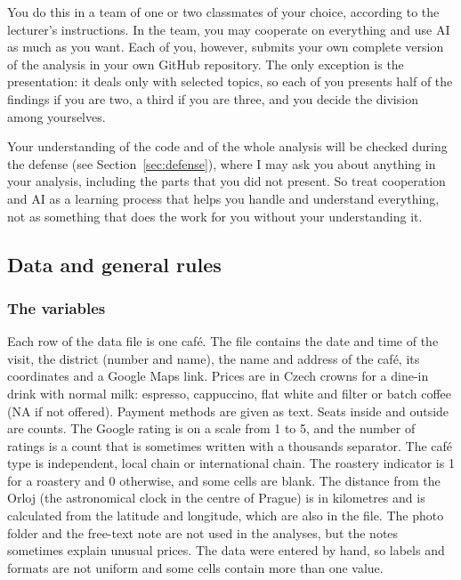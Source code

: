 \documentclass[11pt,a4paper]{article}
\begin{document}
You do this in a team of one or two classmates of your choice, according to the lecturer's instructions. In the team, you may cooperate on everything and use AI as much as you want. Each of you, however, submits your own complete version of the analysis in your own GitHub repository. The only exception is the presentation: it deals only with selected topics, so each of you presents half of the findings if you are two, a third if you are three, and you decide the division among yourselves.

Your understanding of the code and of the whole analysis will be checked during the defense (see Section~\ref{sec:defense}), where I may ask you about anything in your analysis, including the parts that you did not present. So treat cooperation and AI as a learning process that helps you handle and understand everything, not as something that does the work for you without your understanding it.

\subsection{Data and general rules}\label{sec:rules}

\subsubsection*{The variables}

Each row of the data file is one caf\'e. The file contains the date and time of the visit, the district (number and name), the name and address of the caf\'e, its coordinates and a Google Maps link. Prices are in Czech crowns for a dine-in drink with normal milk: espresso, cappuccino, flat white and filter or batch coffee (NA if not offered). Payment methods are given as text. Seats inside and outside are counts. The Google rating is on a scale from 1 to 5, and the number of ratings is a count that is sometimes written with a thousands separator. The caf\'e type is independent, local chain or international chain. The roastery indicator is 1 for a roastery and 0 otherwise, and some cells are blank. The distance from the Orloj (the astronomical clock in the centre of Prague) is in kilometres and is calculated from the latitude and longitude, which are also in the file. The photo folder and the free-text note are not used in the analyses, but the notes sometimes explain unusual prices. The data were entered by hand, so labels and formats are not uniform and some cells contain more than one value.
\end{document}
